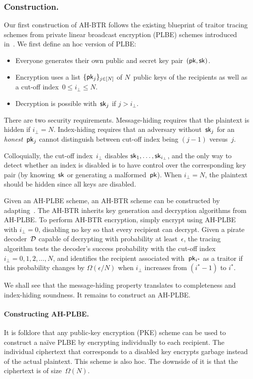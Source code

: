 \subsubsection{Construction.}
Our first construction of AH-BTR follows the existing blueprint of traitor tracing schemes from private linear broadcast encryption (PLBE) schemes introduced in~\cite{EC:BonSahWat06}.
We first define an \ad hoc version of PLBE:
\begin{itemize}
\item Everyone generates their own public and secret key pair~$(\pk,\sk)$.
\item Encryption uses a list $\{\pk_j\}_{j\in[N]}$ of $N$~public keys of the recipients as well as a cut-off index~${0\leq i_\bot\leq N}$.
\item Decryption is possible with~$\sk_j$ if ${j>i_\bot}$.
\end{itemize}
There are two security requirements.
Message-hiding requires that the plaintext is hidden if ${i_\bot=N}$.
Index-hiding requires that an adversary without~$\sk_j$ for an \emph{honest}~$\pk_j$ cannot distinguish between cut-off index being ${(j-1)}$ versus~$j$.

Colloquially, the cut-off index~$i_\bot$ disables $\sk_1,\dots,\sk_{i_\bot}$, and
the only way to detect whether an index is disabled is to have control over the corresponding key pair (by knowing~$\sk$ or generating a malformed~$\pk$).
When ${i_\bot=N}$, the plaintext should be hidden since all keys are disabled.

Given an AH-PLBE scheme, an AH-BTR scheme can be constructed by adapting~\cite{EC:BonSahWat06}.
The AH-BTR inherits key generation and decryption algorithms from AH-PLBE.
To perform AH-BTR encryption, simply encrypt using AH-PLBE with ${i_\bot=0}$, disabling no key so that every recipient can decrypt.
Given a pirate decoder~${\mathcal{D}}$ capable of decrypting with probability at least~$\epsilon$, the tracing algorithm tests the decoder's success probability with the cut-off index ${i_\bot=0,1,2,\dots,N}$, and identifies the recipient associated with~$\pk_{i^\ast}$ as a traitor if this probability changes by $\Omega(\epsilon/N)$ when $i_\bot$ increases from $({i^\ast-1})$ to $i^\ast$.

We shall see that the message-hiding property translates to completeness and index-hiding soundness.
It remains to construct an AH-PLBE.

\paragraph{Constructing AH-PLBE.}
It is folklore that any public-key encryption (PKE) scheme can be used to construct a na{\"i}ve PLBE by encrypting individually to each recipient.
The individual ciphertext that corresponds to a disabled key encrypts garbage instead of the actual plaintext.
This scheme is also \ad hoc.
The downside of it is that the ciphertext is of size~$\Omega(N)$.

